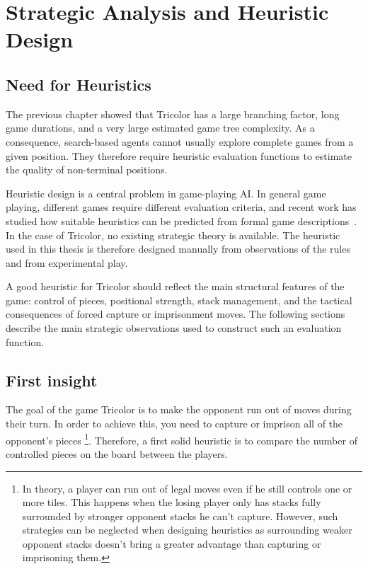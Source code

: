 \chapter{Strategic Analysis and Heuristic Design}
\label{heuristic_design}

\section{Need for Heuristics}

The previous chapter showed that Tricolor has a large branching factor, long game durations, and a very large estimated game tree complexity. As a consequence, search-based agents cannot usually explore complete games from a given position. They therefore require heuristic evaluation functions to estimate the quality of non-terminal positions.

Heuristic design is a central problem in game-playing AI. In general game playing, different games require different evaluation criteria, and recent work has studied how suitable heuristics can be predicted from formal game descriptions~\cite{stephenson2021heuristic}. In the case of Tricolor, no existing strategic theory is available. The heuristic used in this thesis is therefore designed manually from observations of the rules and from experimental play.

A good heuristic for Tricolor should reflect the main structural features of the game: control of pieces, positional strength, stack management, and the tactical consequences of forced capture or imprisonment moves. The following sections describe the main strategic observations used to construct such an evaluation function.

\section{First insight}

The goal of the game Tricolor is to make the opponent run out of moves during their turn. In order to achieve this, you need to capture or imprison all of the opponent's pieces \footnote{In theory, a player can run out of legal moves even if he still controls one or more tiles. This happens when the losing player only has stacks fully surrounded by stronger opponent stacks he can't capture. However, such strategies can be neglected when designing heuristics as surrounding weaker opponent stacks doesn't bring a greater advantage than capturing or imprisoning them.}. Therefore, a first solid heuristic is to compare the number of controlled pieces on the board between the players.

